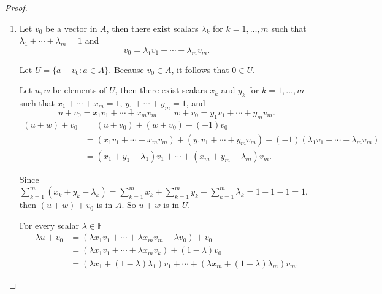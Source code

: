 \begin{proof}
    \begin{enumerate}[label={(\alph*)}]
        \item Let $v_{0}$ be a vector in $A$, then there exist scalars $\lambda_{k}$ for $k = 1, \ldots, m$ such that $\lambda_{1} + \cdots + \lambda_{m} = 1$ and
              \[
                  v_{0} = \lambda_{1}v_{1} + \cdots + \lambda_{m}v_{m}.
              \]

              Let $U = \{ a - v_{0} : a\in A \}$. Because $v_{0}\in A$, it follows that $0\in U$.

              Let $u, w$ be elements of $U$, then there exist scalars $x_{k}$ and $y_{k}$ for $k = 1,\ldots, m$ such that $x_{1} + \cdots + x_{m} = 1$, $y_{1} + \cdots + y_{m} = 1$, and
              \[
                  u + v_{0} = x_{1}v_{1} + \cdots + x_{m}v_{m}\qquad w + v_{0} = y_{1}v_{1} + \cdots + y_{m}v_{m}.
              \]
              \begin{align*}
                  (u + w) + v_{0} & = (u + v_{0}) + (w + v_{0}) + (-1)v_{0}                                                                                        \\
                                  & = (x_{1}v_{1} + \cdots + x_{m}v_{m}) + (y_{1}v_{1} + \cdots + y_{m}v_{m}) + (-1)(\lambda_{1}v_{1} + \cdots + \lambda_{m}v_{m}) \\
                                  & = (x_{1} + y_{1} - \lambda_{1})v_{1} + \cdots + (x_{m} + y_{m} - \lambda_{m})v_{m}.
              \end{align*}

              Since $\sum^{m}_{k=1}(x_{k} + y_{k} - \lambda_{k}) = \sum^{m}_{k=1}x_{k} + \sum^{m}_{k=1}y_{k} - \sum^{m}_{k=1}\lambda_{k} = 1 + 1 - 1 = 1$, then $(u + w) + v_{0}$ is in $A$. So $u + w$ is in $U$.

              For every scalar $\lambda\in\mathbb{F}$
              \begin{align*}
                  \lambda u + v_{0} & = (\lambda x_{1}v_{1} + \cdots + \lambda x_{m}v_{m} - \lambda v_{0}) + v_{0}                                  \\
                                    & = (\lambda x_{1}v_{1} + \cdots + \lambda x_{m}v_{k}) + (1 - \lambda)v_{0}                                     \\
                                    & = (\lambda x_{1} + (1 - \lambda)\lambda_{1})v_{1} + \cdots + (\lambda x_{m} + (1 - \lambda)\lambda_{m})v_{m}.
              \end{align*}


\end{enumerate}
\end{proof}
